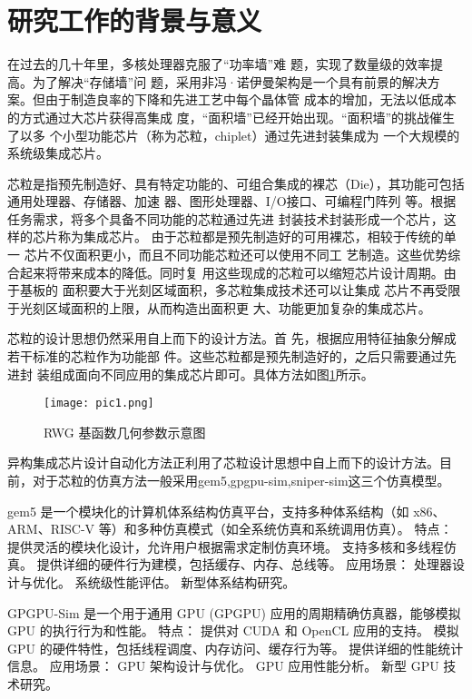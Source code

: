 \documentclass[bachelor]{thesis-uestc}
\begin{document}
\section{研究工作的背景与意义}

在过去的几十年里，多核处理器克服了“功率墙”难
题，实现了数量级的效率提高。为了解决“存储墙”问
题，采用非冯·诺伊曼架构是一个具有前景的解决方
案。但由于制造良率的下降和先进工艺中每个晶体管
成本的增加，无法以低成本的方式通过大芯片获得高集成
度，“面积墙”已经开始出现。“面积墙”的挑战催生了以多
个小型功能芯片（称为芯粒，chiplet）通过先进封装集成为
一个大规模的系统级集成芯片。

芯粒是指预先制造好、具有特定功能的、可组合集成的裸芯（Die），其功能可包括通用处理器、存储器、加速
器、图形处理器、I/O接口、可编程门阵列
等。根据任务需求，将多个具备不同功能的芯粒通过先进
封装技术封装形成一个芯片，这样的芯片称为集成芯片。
由于芯粒都是预先制造好的可用裸芯，相较于传统的单一
芯片不仅面积更小，而且不同功能芯粒还可以使用不同工
艺制造。这些优势综合起来将带来成本的降低。同时复
用这些现成的芯粒可以缩短芯片设计周期。由于基板的
面积要大于光刻区域面积，多芯粒集成技术还可以让集成
芯片不再受限于光刻区域面积的上限，从而构造出面积更
大、功能更加复杂的集成芯片。

芯粒的设计思想仍然采用自上而下的设计方法。首
先，根据应用特征抽象分解成若干标准的芯粒作为功能部
件。这些芯粒都是预先制造好的，之后只需要通过先进封
装组成面向不同应用的集成芯片即可。具体方法如图\ref{pic1}所示。
\begin{figure}[h]
\texttt{[image: pic1.png]}
\caption{RWG 基函数几何参数示意图}
\label{pic1}
\end{figure}

异构集成芯片设计自动化方法正利用了芯粒设计思想中自上而下的设计方法。目前，对于芯粒的仿真方法一般采用gem5,gpgpu-sim,sniper-sim这三个仿真模型。

gem5 是一个模块化的计算机体系结构仿真平台，支持多种体系结构（如 x86、ARM、RISC-V 等）和多种仿真模式（如全系统仿真和系统调用仿真）。
特点：
提供灵活的模块化设计，允许用户根据需求定制仿真环境。
支持多核和多线程仿真。
提供详细的硬件行为建模，包括缓存、内存、总线等。
应用场景：
处理器设计与优化。
系统级性能评估。
新型体系结构研究。

GPGPU-Sim 是一个用于通用 GPU (GPGPU) 应用的周期精确仿真器，能够模拟 GPU 的执行行为和性能。
特点：
提供对 CUDA 和 OpenCL 应用的支持。
模拟 GPU 的硬件特性，包括线程调度、内存访问、缓存行为等。
提供详细的性能统计信息。
应用场景：
GPU 架构设计与优化。
GPU 应用性能分析。
新型 GPU 技术研究。
\end{document}
